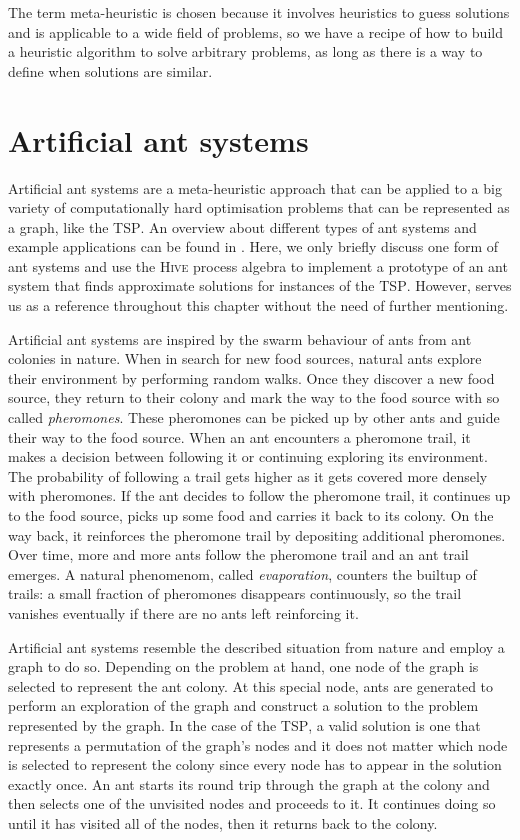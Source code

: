The term meta-heuristic is chosen because it involves heuristics to guess solutions and is applicable to a wide field of problems, so we have a recipe of how to build a heuristic algorithm to solve arbitrary problems, as long as there is a way to define when solutions are similar.

\section{Artificial ant systems}
Artificial ant systems are a meta-heuristic approach that can be applied to a big variety of computationally hard optimisation problems that can be represented as a graph, like the \textsc{TSP}. An overview about different types of ant systems and example applications can be found in \cite{Dorigo:2004:ACO:975277}. Here, we only briefly discuss one form of ant systems and use the \textsc{Hive} process algebra to implement a prototype of an ant system that finds approximate solutions for instances of the \textsc{TSP}. However, \cite{Dorigo:2004:ACO:975277} serves us as a reference throughout this chapter without the need of further mentioning.

Artificial ant systems are inspired by the swarm behaviour of ants from ant colonies in nature. When in search for new food sources, natural ants explore their environment by performing random walks. Once they discover a new food source, they return to their colony and mark the way to the food source with so called \textit{pheromones}. These pheromones can be picked up by other ants and guide their way to the food source. When an ant encounters a pheromone trail, it makes a decision between following it or continuing exploring its environment. The probability of following a trail gets higher as it gets covered more densely with pheromones. If the ant decides to follow the pheromone trail, it continues up to the food source, picks up some food and carries it back to its colony. On the way back, it reinforces the pheromone trail by depositing additional pheromones. Over time, more and more ants follow the pheromone trail and an ant trail emerges. A natural phenomenom, called \textit{evaporation}, counters the builtup of trails: a small fraction of pheromones disappears continuously, so the trail vanishes eventually if there are no ants left reinforcing it.

Artificial ant systems resemble the described situation from nature and employ a graph to do so. Depending on the problem at hand, one node of the graph is selected to represent the ant colony. At this special node, ants are generated to perform an exploration of the graph and construct a solution to the problem represented by the graph. In the case of the \textsc{TSP}, a valid solution is one that represents a permutation of the graph's nodes and it does not matter which node is selected to represent the colony since every node has to appear in the solution exactly once. An ant starts its round trip through the graph at the colony and then selects one of the unvisited nodes and proceeds to it. It continues doing so until it has visited all of the nodes, then it returns back to the colony.


